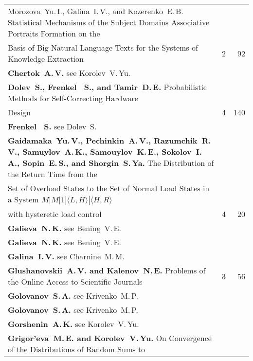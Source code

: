 {\begin{tabular}{p{399pt}rr}
{Morozova~Yu.\,I., Galina~I.\,V., and Kozerenko~E.\,B.}
Statistical Mechanisms of the Subject Domains Associative Portraits Formation
on the\linebreak
\vspace*{-12pt}\\
\hspace*{23pt}Basis of Big Natural Language Texts for the Systems
of Knowledge Extraction\dotfill&2&92\\
\textbf{Chertok~A.\,V.} see Korolev~V.\,Yu.&&\\
\textbf{Dolev~S., Frenkel~ S., and Tamir~D.\,E.} Probabilistic Methods for
Self-Correcting Hardware\linebreak
\vspace*{-12pt}\\
\hspace*{23pt}Design\dotfill&4&140\\
\textbf{Frenkel~ S.} see Dolev~S.&&\\
\hangindent=23pt\noindent\textbf{Gaidamaka~Yu.\,V., Pechinkin~A.\,V., Razumchik~R.\,V.,
Samuylov~A.\,K., Samouylov~K.\,E., Sokolov~I.\,A., Sopin~E.\,S., and
Shorgin~S.\,Ya.}
The Distribution of the Return Time from the\linebreak
\vspace*{-12pt}\\
\hspace*{23pt}Set of Overload States to the Set of Normal Load States in a
System $M|M|1|\langle L,H \rangle |\langle H,R\rangle$\linebreak
\vspace*{-12pt}\\
\hspace*{23pt}with hysteretic load control\dotfill&4&20\\
\textbf{Galieva~N.\,K.} see Bening~V.\,E.&&\\
\textbf{Galieva~N.\,K.} see Bening~V.\,E.&&\\
\textbf{Galina~I.\,V.} see Charnine~M.\,M.&&\\
\textbf{Glushanovskii~A.\,V. and Kalenov~N.\,E.}
Problems of the Online Access to Scientific Journals\dotfill&3&56\\
\textbf{Golovanov~S.\,A.} see Krivenko~M.\,P.&&\\
\textbf{Golovanov~S.\,A.} see Krivenko~M.\,P.&&\\
\textbf{Gorshenin~A.\,K.} see Korolev~V.\,Yu.&&\\
\textbf{Grigor'eva~M.\,E. and Korolev~V.\,Yu.}
On Convergence of the Distributions of Random Sums to\linebreak

\end{tabular}}
